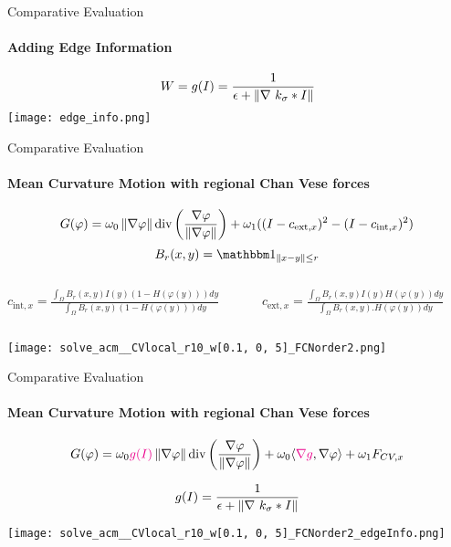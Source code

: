 \begin{frame}{Comparative Evaluation}
    \framesubtitle{Adding Edge Information}

    $$ W = g(I) = \frac{1}{\epsilon + \left\lVert\nabla\ k_\sigma * I\right\rVert} $$
    \centering
    \texttt{[image: edge\_info.png]}
\end{frame}

\begin{frame}{Comparative Evaluation}
    \framesubtitle{Mean Curvature Motion with  regional Chan Vese forces}

    $$ G(\varphi) = \omega_0\left\lVert\nabla\varphi\right\rVert\textrm{div}\left(\frac{\nabla \varphi}{\left\lVert\nabla\varphi\right\rVert}\right) + \omega_1 ((I - c_{\textrm{ext}, x})^2 - (I - c_{\textrm{int}, x})^2 ) $$
    $$ B_r(x, y) = \ones_{\norm{x - y} \leq r}$$
    \begin{columns}
        \begin{column}{0.5\textwidth}
            $ c_{\textrm{int}, x} = \frac{\int_{\Omega}B_r(x, y)I(y)(1 - H(\varphi(y)))dy}{\int_\Omega B_r(x, y) (1 - H(\varphi(y))) dy} $
        \end{column}
        \begin{column}{.5\textwidth}
            $
            c_{\textrm{ext}, x} = \frac{\int_{\Omega}B_r(x, y)I(y)H(\varphi(y))dy}{\int_\Omega B_r(x, y) . H(\varphi(y)) dy}
            $
        \end{column}
    \end{columns}
    
    \vspace{0.4cm}

    \texttt{[image: solve\_acm\_\_CVlocal\_r10\_w[0.1, 0, 5]\_FCNorder2.png]}
\end{frame}

\begin{frame}{Comparative Evaluation}
    \framesubtitle{Mean Curvature Motion with  regional Chan Vese forces }

    $$ G(\varphi) = \omega_0\textcolor{magenta}{g(I)}\left\lVert\nabla\varphi\right\rVert\textrm{div}\left(\frac{\nabla \varphi}{\left\lVert\nabla\varphi\right\rVert}\right) + \omega_0\langle \textcolor{magenta}{\nabla g}, \nabla\varphi \rangle +  \omega_1 F_{CV,x}  $$

    $$ g(I) = \frac{1}{\epsilon + \norm{\nabla\ k_\sigma * I}} $$


    \vspace{0.7cm}

    \texttt{[image: solve\_acm\_\_CVlocal\_r10\_w[0.1, 0, 5]\_FCNorder2\_edgeInfo.png]}
\end{frame}

